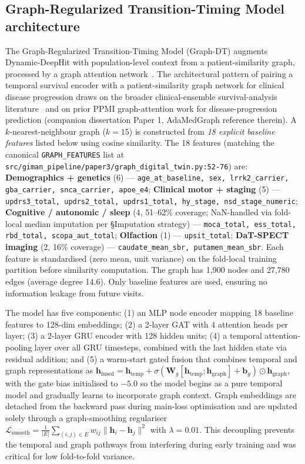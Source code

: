 \documentclass[11pt]{article}
\begin{document}
\subsection*{Graph-Regularized Transition-Timing Model architecture}

The Graph-Regularized Transition-Timing Model (Graph-DT) augments Dynamic-DeepHit with population-level context from a patient-similarity graph, processed by a graph attention network~\cite{velickovic2018graph}. The architectural pattern of pairing a temporal survival encoder with a patient-similarity graph network for clinical disease progression draws on the broader clinical-ensemble survival-analysis literature~\cite{shamsutdinova2024survcompare} and on prior PPMI graph-attention work for disease-progression prediction (companion dissertation Paper 1, AdaMedGraph reference therein). A $k$-nearest-neighbour graph ($k{=}15$) is constructed from \emph{18 explicit baseline features} listed below using cosine similarity. The 18 features (matching the canonical \texttt{GRAPH\_FEATURES} list at \texttt{src/giman\_pipeline/paper3/graph\_digital\_twin.py:52-76}) are: \textbf{Demographics + genetics} (6) — \texttt{age\_at\_baseline, sex, lrrk2\_carrier, gba\_carrier, snca\_carrier, apoe\_e4}; \textbf{Clinical motor + staging} (5) — \texttt{updrs3\_total, updrs2\_total, updrs1\_total, hy\_stage, nsd\_stage\_numeric}; \textbf{Cognitive / autonomic / sleep} (4, 51--62\% coverage; NaN-handled via fold-local median imputation per \S Imputation strategy) — \texttt{moca\_total, ess\_total, rbd\_total, scopa\_aut\_total}; \textbf{Olfaction} (1) — \texttt{upsit\_total}; \textbf{DaT-SPECT imaging} (2, 16\% coverage) — \texttt{caudate\_mean\_sbr, putamen\_mean\_sbr}. Each feature is standardised (zero mean, unit variance) on the fold-local training partition before similarity computation. The graph has 1{,}900 nodes and 27{,}780 edges (average degree 14.6). Only baseline features are used, ensuring no information leakage from future visits.

The model has five components: (1) an MLP node encoder mapping 18 baseline features to 128-dim embeddings; (2) a 2-layer GAT with 4 attention heads per layer; (3) a 2-layer GRU encoder with 128 hidden units; (4) a temporal attention-pooling layer over all GRU timesteps, combined with the last hidden state via residual addition; and (5) a warm-start gated fusion that combines temporal and graph representations as $\mathbf{h}_{\mathrm{fused}} = \mathbf{h}_{\mathrm{temp}} + \sigma(\mathbf{W}_g[\mathbf{h}_{\mathrm{temp}}; \mathbf{h}_{\mathrm{graph}}] + \mathbf{b}_g) \odot \mathbf{h}_{\mathrm{graph}}$, with the gate bias initialised to $-5.0$ so the model begins as a pure temporal model and gradually learns to incorporate graph context. Graph embeddings are detached from the backward pass during main-loss optimisation and are updated solely through a graph-smoothing regulariser $\mathcal{L}_{\mathrm{smooth}} = \frac{1}{|E|}\sum_{(i,j)\in E} w_{ij}\|\mathbf{h}_i - \mathbf{h}_j\|^2$ with $\lambda{=}0.01$. This decoupling prevents the temporal and graph pathways from interfering during early training and was critical for low fold-to-fold variance.
\end{document}
